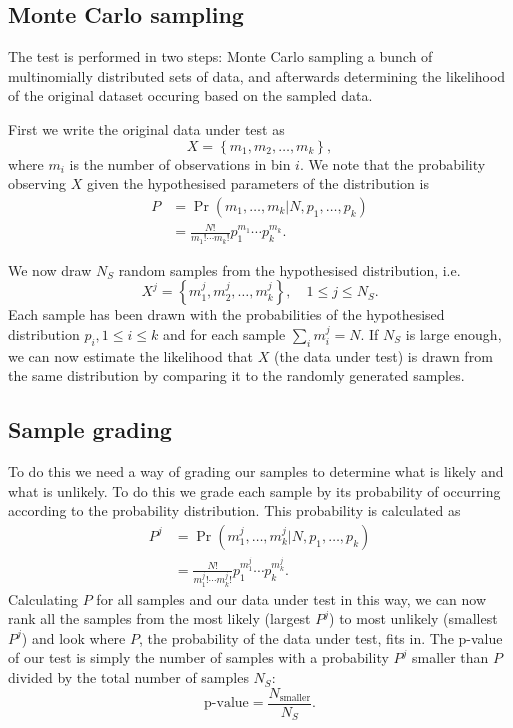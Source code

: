 \documentclass{ol-softwaremanual}
\begin{document}
\subsection{Monte Carlo sampling}

The test is performed in two steps: Monte Carlo sampling a bunch of 
multinomially distributed sets of data, and afterwards determining the 
likelihood of the original dataset occuring based on the sampled data.

First we write the original data under test as
\begin{equation}
X = \left\{ m_1, m_2, \ldots , m_k \right\},
\end{equation}
where $m_i$ is the number of observations in bin $i$. We note that the 
probability observing $X$ given the hypothesised parameters of the distribution 
is
\begin{align}
P &= \Pr\left(m_1, \ldots, m_k | N , p_1, \ldots, p_k\right) \nonumber \\
&= \frac{N!}{m_1! \cdots m_k!} p_1^{m_1} \cdots p_k^{m_k}.
\end{align}

We now draw $N_S$ random samples from the hypothesised distribution, i.e.
\begin{equation}
X^j = \left\{ m_1^j, m_2^j, \ldots, m_k^j \right\},\quad 1\leq j \leq N_S.
\end{equation}
Each sample has been drawn with the probabilities of the hypothesised 
distribution $p_i, 1\leq i\leq k$ and for each sample $\sum_i m_i^j = N$.
If $N_S$ is large enough, we can now estimate the likelihood that $X$ (the data 
under test) is drawn 
from the same distribution by comparing it to the randomly generated samples.

\subsection{Sample grading}

To do this we need a way of grading our samples to determine what is likely and 
what is unlikely. To do this we grade each sample by its 
probability of occurring according to the probability distribution. This 
probability is calculated as
\begin{align}
P^j &= \Pr\left(m^j_1, \ldots, m^j_k | N , p_1, \ldots, p_k\right) \nonumber \\ 
\label{eq:prob}
&= \frac{N!}{m^j_1! \cdots m^j_k!} p_1^{m^j_1} \cdots p_k^{m^j_k}.
\end{align}
Calculating $P$ for all samples and our data under test in this way, we can 
now rank all the samples from the most likely (largest $P^j$) to most unlikely 
(smallest $P^j$) and look where $P$, the probability of the data under test, 
fits 
in. 
The p-value of our test is simply the number of samples with a probability 
$P^j$ smaller than $P$ divided by the total number of samples $N_S$:
\begin{equation}
\textrm{p-value} = \frac{N_{\textrm{smaller}}}{N_S}.
\end{equation}
\end{document}
